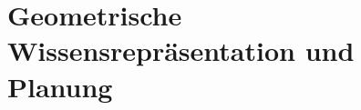 \section{Geometrische Wissensrepräsentation und Planung}%
\label{grep:sec:geometrische_wissensrepraesentation_und_planung}
